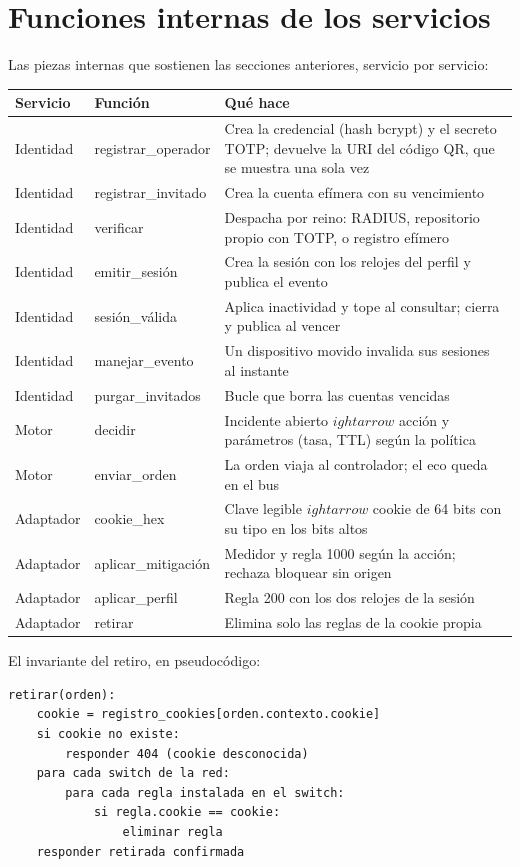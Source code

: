 \documentclass[11pt,a4paper]{article}
\begin{document}
\section{Funciones internas de los servicios}

Las piezas internas que sostienen las secciones anteriores, servicio por servicio:

\begin{longtable}{p{3.4cm}p{4.4cm}p{6.2cm}}
\toprule
\textbf{Servicio} & \textbf{Función} & \textbf{Qué hace}\\
\midrule
Identidad & registrar\_operador & Crea la credencial (hash bcrypt) y el secreto TOTP; devuelve la URI del código QR, que se muestra una sola vez\\
Identidad & registrar\_invitado & Crea la cuenta efímera con su vencimiento\\
Identidad & verificar & Despacha por reino: RADIUS, repositorio propio con TOTP, o registro efímero\\
Identidad & emitir\_sesión & Crea la sesión con los relojes del perfil y publica el evento\\
Identidad & sesión\_válida & Aplica inactividad y tope al consultar; cierra y publica al vencer\\
Identidad & manejar\_evento & Un dispositivo movido invalida sus sesiones al instante\\
Identidad & purgar\_invitados & Bucle que borra las cuentas vencidas\\
Motor & decidir & Incidente abierto $
ightarrow$ acción y parámetros (tasa, TTL) según la política\\
Motor & enviar\_orden & La orden viaja al controlador; el eco queda en el bus\\
Adaptador & cookie\_hex & Clave legible $
ightarrow$ cookie de 64 bits con su tipo en los bits altos\\
Adaptador & aplicar\_mitigación & Medidor y regla 1000 según la acción; rechaza bloquear sin origen\\
Adaptador & aplicar\_perfil & Regla 200 con los dos relojes de la sesión\\
Adaptador & retirar & Elimina solo las reglas de la cookie propia\\
\bottomrule
\end{longtable}

El invariante del retiro, en pseudocódigo:

\begin{verbatim}
retirar(orden):
    cookie = registro_cookies[orden.contexto.cookie]
    si cookie no existe:
        responder 404 (cookie desconocida)
    para cada switch de la red:
        para cada regla instalada en el switch:
            si regla.cookie == cookie:
                eliminar regla
    responder retirada confirmada
\end{verbatim}
\end{document}
